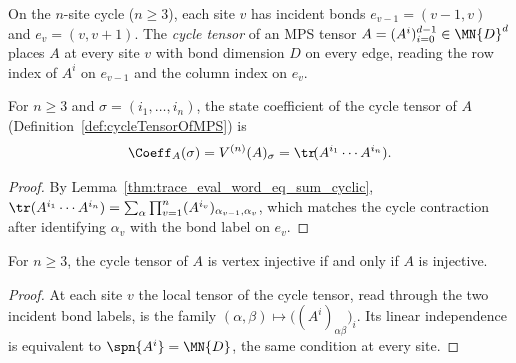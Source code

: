 \begin{definition}%
    \label{def:cycleTensorOfMPS}
    \leanok
    On the $n$-site cycle ($n\ge 3$), each site $v$ has incident bonds
    $e_{v-1}=(v-1,v)$ and $e_v=(v,v+1)$. The \emph{cycle tensor} of an MPS
    tensor $A=(A^i)_{i=0}^{d-1}\in\MN{D}^d$ places $A$ at every site $v$ with
    bond dimension $D$ on every edge, reading the row index of $A^i$ on
    $e_{v-1}$ and the column index on $e_v$.
\end{definition}

\begin{lemma}%
    \label{lem:stateCoeff_cycleTensorOfMPS}
    \leanok
    For $n \ge 3$ and $\sigma = (i_1, \ldots, i_n)$, the state coefficient of
    the cycle tensor of $A$ (Definition~\ref{def:cycleTensorOfMPS}) is
    \begin{align}
        \Coeff_A(\sigma) = V^{(n)}(A)_\sigma = \tr\!(A^{i_1} \cdots A^{i_n}).
        \notag
    \end{align}
\end{lemma}
\begin{proof}\leanok
    By Lemma~\ref{thm:trace_eval_word_eq_sum_cyclic},
    $\tr(A^{i_1}\cdots A^{i_n})=\sum_{\alpha}\prod_{v=1}^n (A^{i_v})_{\alpha_{v-1},\alpha_v}$,
    which matches the cycle contraction after identifying $\alpha_v$ with the
    bond label on $e_v$.
\end{proof}

\begin{lemma}%
    \label{lem:isVertexInjective_cycleTensorOfMPS_iff}
    \leanok
    For $n\ge 3$, the cycle tensor of $A$ is vertex injective if and only if
    $A$ is injective.
\end{lemma}
\begin{proof}\leanok
    At each site $v$ the local tensor of the cycle tensor, read through the two
    incident bond labels, is the family
    $(\alpha,\beta)\mapsto\bigl((A^i)_{\alpha\beta}\bigr)_i$. Its linear independence is equivalent to
    $\spn\{A^i\}=\MN{D}$, the same condition at every site.
\end{proof}


